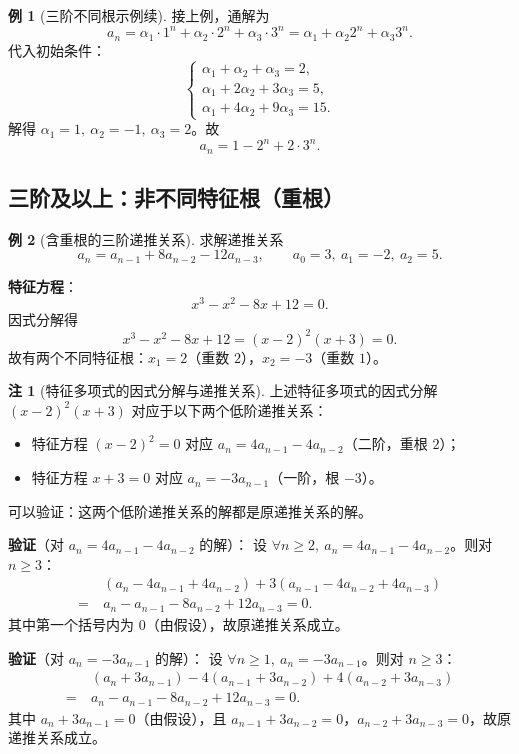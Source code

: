 \documentclass[UTF8,11pt,a4paper]{ctexbook}   %
\theoremstyle{definition}
\newtheorem{example}{例}[section]
\newtheorem{remark}{注}[section]
\begin{document}
\begin{example}[三阶不同根示例续]
接上例，通解为
\[
a_n = \alpha_1 \cdot 1^n + \alpha_2 \cdot 2^n + \alpha_3 \cdot 3^n = \alpha_1 + \alpha_2 2^n + \alpha_3 3^n.
\]
代入初始条件：
\[
\begin{cases}
\alpha_1 + \alpha_2 + \alpha_3 = 2,\\[0.3em]
\alpha_1 + 2\alpha_2 + 3\alpha_3 = 5,\\[0.3em]
\alpha_1 + 4\alpha_2 + 9\alpha_3 = 15.
\end{cases}
\]
解得 $\alpha_1 = 1,\ \alpha_2 = -1,\ \alpha_3 = 2$。故
\[
a_n = 1 - 2^n + 2 \cdot 3^n.
\]
\end{example}

\subsection{三阶及以上：非不同特征根（重根）}

\begin{example}[含重根的三阶递推关系]
求解递推关系
\[
a_n = a_{n-1} + 8a_{n-2} - 12a_{n-3},\qquad a_0 = 3,\ a_1 = -2,\ a_2 = 5.
\]

\textbf{特征方程}：
\[
x^3 - x^2 - 8x + 12 = 0.
\]
因式分解得
\[
x^3 - x^2 - 8x + 12 = (x-2)^2(x+3) = 0.
\]
故有两个不同特征根：$x_1 = 2$（重数 $2$），$x_2 = -3$（重数 $1$）。
\end{example}

\begin{remark}[特征多项式的因式分解与递推关系]
上述特征多项式的因式分解 $(x-2)^2(x+3)$ 对应于以下两个低阶递推关系：
\begin{itemize}
    \item 特征方程 $(x-2)^2 = 0$ 对应 $a_n = 4a_{n-1} - 4a_{n-2}$（二阶，重根 $2$）；
    \item 特征方程 $x+3 = 0$ 对应 $a_n = -3a_{n-1}$（一阶，根 $-3$）。
\end{itemize}

可以验证：这两个低阶递推关系的解都是原递推关系的解。

\textbf{验证}（对 $a_n = 4a_{n-1} - 4a_{n-2}$ 的解）：
设 $\forall n \ge 2,\ a_n = 4a_{n-1} - 4a_{n-2}$。则对 $n \ge 3$：
\begin{align*}
&\ (a_n - 4a_{n-1} + 4a_{n-2}) + 3(a_{n-1} - 4a_{n-2} + 4a_{n-3})\\
=&\ a_n - a_{n-1} - 8a_{n-2} + 12a_{n-3} = 0.
\end{align*}
其中第一个括号内为 $0$（由假设），故原递推关系成立。

\textbf{验证}（对 $a_n = -3a_{n-1}$ 的解）：
设 $\forall n \ge 1,\ a_n = -3a_{n-1}$。则对 $n \ge 3$：
\begin{align*}
&\ (a_n + 3a_{n-1}) - 4(a_{n-1} + 3a_{n-2}) + 4(a_{n-2} + 3a_{n-3})\\
=&\ a_n - a_{n-1} - 8a_{n-2} + 12a_{n-3} = 0.
\end{align*}
其中 $a_n + 3a_{n-1} = 0$（由假设），且 $a_{n-1} + 3a_{n-2} = 0$，$a_{n-2} + 3a_{n-3} = 0$，故原递推关系成立。
\end{remark}
\end{document}
